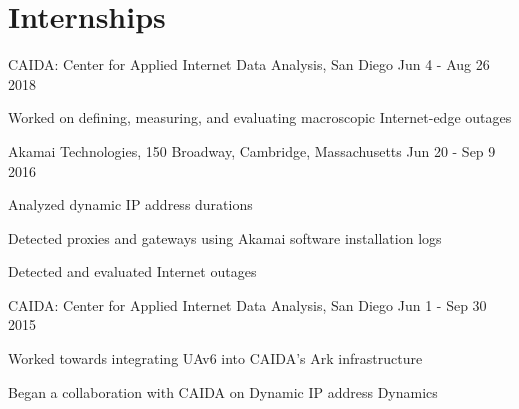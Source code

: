 \section*{Internships}
\label{sec:internships}

\begin{myitemize}
\item{CAIDA: Center for Applied Internet Data Analysis, San Diego}
  \hfill Jun 4 - Aug 26 2018\\
  \begin{myitemize}
  \item {Worked on defining, measuring, and evaluating macroscopic
    Internet-edge outages}
\end{myitemize}

\item{Akamai Technologies, 150 Broadway, Cambridge, Massachusetts}
  \hfill Jun 20 - Sep 9 2016\\
  \begin{myitemize}
  \item{Analyzed dynamic IP address durations}
  \item{Detected proxies and gateways using Akamai software
      installation logs}
  \item{Detected and evaluated Internet outages}
  \end{myitemize}


\item{CAIDA: Center for Applied Internet Data Analysis, San Diego}
  \hfill Jun 1 - Sep 30 2015\\
  \begin{myitemize}
  \item {Worked towards integrating UAv6 into CAIDA's Ark infrastructure}
  \item{Began a collaboration with CAIDA on Dynamic IP address Dynamics}
  \end{myitemize}
  
\end{myitemize}


